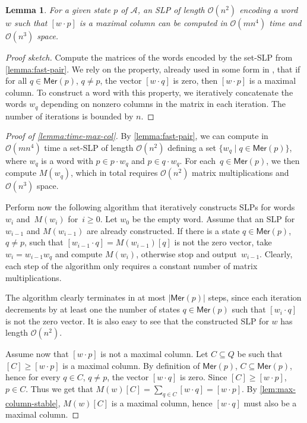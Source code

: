 \documentclass[11pt,a4paper]{amsart}
\newcommand{\OO}{\mathcal{O}}
\newcommand{\Aa}{\mathcal{A}}
\newcommand{\Mer}{\mathsf{Mer}}
\theoremstyle{plain}
\newtheorem{lem}[thm]{Lemma}
\theoremstyle{definition}
\theoremstyle{defC}
\theoremstyle{thmC}
\theoremstyle{plain}
\numberwithin{equation}{section}
\begin{document}
\begin{lem}\label{lemma:time-max-col}
    For a given state $p$ of $\Aa$, an SLP of length $\OO(n^2)$ encoding a word $w$ such that $[w \cdot p]$ is a maximal column can be computed in $\OO(mn^4)$ time and $\OO(n^3)$ space.
\end{lem}
\begin{proof}[Proof sketch]
Compute the matrices of the words encoded by the set-SLP from \autoref{lemma:fast-pair}. 
We rely on the property, already used in some form in \cite{Carpi1988}, that if for all $q \in \Mer(p)$, $q \ne p$, the vector $[w \cdot q]$ is zero, then $[w \cdot p]$ is a maximal column. To construct a word with this property, we iteratively concatenate the words $w_q$ depending on nonzero columns in the matrix in each iteration. The number of iterations is bounded by $n$.
\end{proof}

\begin{proof}[Proof of \autoref{lemma:time-max-col}]
By \autoref{lemma:fast-pair}, 
we can compute in $\OO(mn^4)$ time a set-SLP of length $\OO(n^2)$ defining a set $\{w_q \mid q \in \Mer(p)\}$, where $w_q$ is a word with $p \in p \cdot w_q$ and $p \in q \cdot w_q$. For each~$q \in \Mer(p)$, we then compute $M(w_q)$, which in total requires $\OO(n^2)$ matrix multiplications and $\OO(n^3)$ space.

Perform now the following algorithm that iteratively constructs SLPs for words $w_i$ and~$M(w_i)$ for~$i \ge 0$. Let $w_0$ be the empty word. Assume that an SLP for $w_{i - 1}$ and $M(w_{i - 1})$ are already constructed. If there is a state $q \in \Mer(p)$, $q \ne p$, such that $[w_{i - 1} \cdot q] = M(w_{i - 1})[q]$ is not the zero vector, take $w_i = w_{i - 1} w_q$ and compute $M(w_i)$, otherwise stop and output~$w_{i - 1}$. Clearly, each step of the algorithm only requires a constant number of matrix multiplications.

The algorithm clearly terminates in at most $|\Mer(p)|$ steps, since each iteration decrements by at least one the number of states $q \in \Mer(p)$ such that $[w_i \cdot q]$ is not the zero vector. It is also easy to see that the constructed SLP for $w$ has length $\OO(n^2)$.

Assume now that $[w \cdot p]$ is not a maximal column. Let $C \subseteq Q$ be such that $[C] \ge [w \cdot p]$ is a maximal column. By definition of $\Mer(p)$, $C \subseteq \Mer(p)$, hence for every $q \in C$, $q \ne p$, the vector $[w \cdot q]$ is zero. Since $[C] \ge [w \cdot p]$, $p \in C$. Thus we get that $M(w)[C] = \sum_{q \in C} [w \cdot q] = [w \cdot p]$.
By \autoref{lem:max-column-stable}, $M(w)[C]$ is a maximal column, hence $[w \cdot q]$ must also be a maximal column. 
\end{proof}
\end{document}
